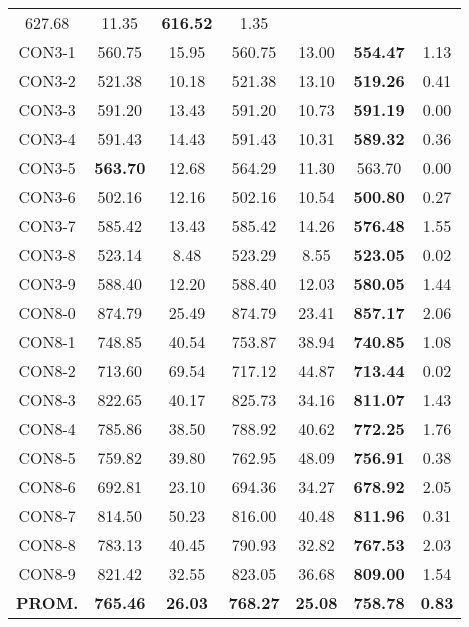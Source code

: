 \begin{table}[ht]
\begin{tabular}{c c c c c c c}
627.68 & 11.35 & \bf{616.52} & 
1.35\\CON3-1 & 560.75 & 15.95 & 
560.75 & 13.00 & \bf{554.47} & 
1.13\\CON3-2 & 521.38 & 10.18 & 
521.38 & 13.10 & \bf{519.26} & 
0.41\\CON3-3 & 591.20 & 13.43 & 
591.20 & 10.73 & \bf{591.19} & 
0.00\\CON3-4 & 591.43 & 14.43 & 
591.43 & 10.31 & \bf{589.32} & 
0.36\\CON3-5 & \bf{563.70} & 12.68 & 
564.29 & 11.30 & 563.70 & 0.00\\
CON3-6 & 502.16 & 12.16 & 
502.16 & 10.54 & \bf{500.80} & 
0.27\\CON3-7 & 585.42 & 13.43 & 
585.42 & 14.26 & \bf{576.48} & 
1.55\\CON3-8 & 523.14 & 8.48 & 
523.29 & 8.55 & \bf{523.05} & 
0.02\\CON3-9 & 588.40 & 12.20 & 
588.40 & 12.03 & \bf{580.05} & 
1.44\\CON8-0 & 874.79 & 25.49 & 
874.79 & 23.41 & \bf{857.17} & 
2.06\\CON8-1 & 748.85 & 40.54 & 
753.87 & 38.94 & \bf{740.85} & 
1.08\\CON8-2 & 713.60 & 69.54 & 
717.12 & 44.87 & \bf{713.44} & 
0.02\\CON8-3 & 822.65 & 40.17 & 
825.73 & 34.16 & \bf{811.07} & 
1.43\\CON8-4 & 785.86 & 38.50 & 
788.92 & 40.62 & \bf{772.25} & 
1.76\\CON8-5 & 759.82 & 39.80 & 
762.95 & 48.09 & \bf{756.91} & 
0.38\\CON8-6 & 692.81 & 23.10 & 
694.36 & 34.27 & \bf{678.92} & 
2.05\\CON8-7 & 814.50 & 50.23 & 
816.00 & 40.48 & \bf{811.96} & 
0.31\\CON8-8 & 783.13 & 40.45 & 
790.93 & 32.82 & \bf{767.53} & 
2.03\\CON8-9 & 821.42 & 32.55 & 
823.05 & 36.68 & \bf{809.00} & 
1.54\\\bf{PROM.} & 
\bf{765.46} & \bf{26.03} & \bf{768.27} & \bf{25.08} & \bf{758.78} & \bf{0.83}\\[1ex]\hline
\end{tabular}
\label{table:nonlin}
\end{table} \clearpage
